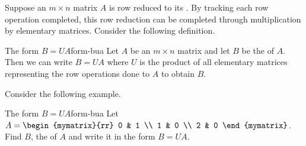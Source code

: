Suppose an $m \times n$ matrix $A$ is row reduced to its {\rref}. By tracking each row operation completed, this row reduction can be completed through multiplication by elementary matrices. Consider the following definition.

\begin{definition}{The form $B=UA$}{form-bua}
Let $A$ be an $m \times n$ matrix and let $B$ be the {\rref} of $A$. Then we can write $B = UA$ where $U$ is the product of all elementary matrices representing the row operations done to $A$ to obtain $B$. 
\end{definition}

Consider the following example.

\begin{example}{The form $B=UA$}{form-bua}
Let $A = \begin{mymatrix}{rr}
0 & 1 \\
1 & 0 \\
2 & 0
\end{mymatrix}$. Find $B$, the {\rref} of $A$ and write it in the form $B=UA$.
\end{example}

